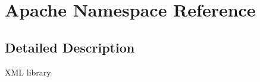 \hypertarget{namespaceApache}{}\section{Apache Namespace Reference}
\label{namespaceApache}


\subsection{Detailed Description}
X\+ML library 
